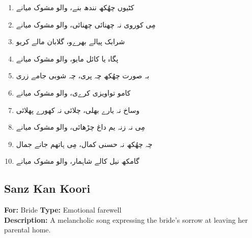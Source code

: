 \documentclass[12pt]{article}
\newcommand{\bigarabic}[1]{\fontsize{16pt}{18pt}\selectfont \textarabic{#1}}
\begin{document}
\begin{multicols}{2}
\begin{multicols}{2}
\columnbreak

\begin{RTL}
\begin{enumerate}[leftmargin=*, label=\arabic*., font=\fontsize{16pt}{18pt}\selectfont]
  \item \bigarabic{کٹیوں چھُکھ نندھ بنے، والو مشوک میانے}
  \item \bigarabic{مِی کوروی نہ چھنائی چھنائی، والو مشوک میانے}
  \item \bigarabic{شرابک پیالے بھرےو، گلابان مالے کریو}
  \item \bigarabic{پگاہ یا کائل مایو، والو مشوک میانے}
  \item \bigarabic{بہ صورت چھُکھ چہ پری، چہ شوبی جامے زری}
  \item \bigarabic{کامو تواویزی کرےی، والو مشوک میانے}
  \item \bigarabic{وساخ نہ یارے بھلی، چلائی نہ کھورے پھلائی}
  \item \bigarabic{مِی نہ زنہ یم داغ چڑھائی، والو مشوک میانے}
  \item \bigarabic{چہ چھُکھ نہ حسنی کمال، مِی ہاتھم جانے جمال}
  \item \bigarabic{گامکھ نیل کالے شاہمار، والو مشوک میانے}
\end{enumerate}
\end{RTL}
\end{multicols}

\subsection*{Sanz Kan Koori}
\textbf{For:} Bride \quad \textbf{Type:} Emotional farewell\\
\textbf{Description:} A melancholic song expressing the bride's sorrow at leaving her parental home.


\end{multicols}
\end{document}
